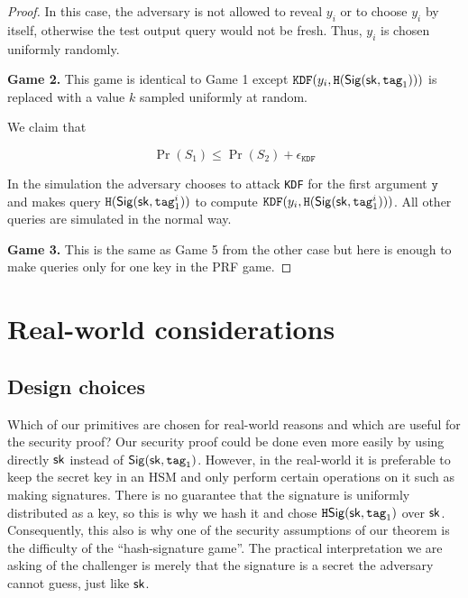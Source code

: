 \documentclass[12pt]{article}
\begin{document}
\begin{proof}
In this case, the adversary is not allowed to reveal $y_i$ or to choose $y_i$ by itself, otherwise the test output query would not be fresh. Thus, $y_i$ is chosen uniformly randomly.  


\noindent \textbf{Game 2.} This game is identical to Game 1 except $\texttt{KDF}(y_i, \texttt{H}(\mathsf{Sig} (\mathsf{sk}, \texttt{tag}_1)))$ is replaced with a value $k$ sampled uniformly at random. 

We claim that 

$$
\Pr(S_1) \le \Pr(S_2) + \epsilon_{\texttt{KDF}}
$$

In the simulation the adversary chooses to attack \texttt{KDF} for the first argument $\texttt{y}$ and makes query  $\texttt{H}(\mathsf{Sig} (\mathsf{sk}, \texttt{tag}^i_1))$ to compute $\texttt{KDF}(y_i, \texttt{H}(\mathsf{Sig} (\mathsf{sk}, \texttt{tag}^i_1)))$. All other queries are simulated in the normal way.

\noindent \textbf{Game 3.} This is the same as Game 5 from the other case but here is enough to make queries only for one key in the PRF game.
\end{proof}

\section{Real-world considerations} \label{sec:notes}

\subsection{Design choices}
Which of our primitives are chosen for real-world reasons and which are useful for the security proof? Our security proof could be done even more easily by using directly $\mathsf{sk}$ instead of $\mathsf{Sig}(\mathsf{sk}, \texttt{tag}_1)$. However, in the real-world it is preferable to keep the secret key in an HSM and only perform certain operations on it such as making signatures. There is no guarantee that the signature is uniformly distributed as a key, so this is why we hash it and chose $\texttt{H}\mathsf{Sig}(\mathsf{sk}, \texttt{tag}_1)$ over $\mathsf{sk}$. Consequently, this also is why one of the security assumptions of our theorem is the difficulty of the ``hash-signature game''. The practical interpretation we are asking of the challenger is merely that the signature is a secret the adversary cannot guess, just like $\mathsf{sk}$.
\end{document}
